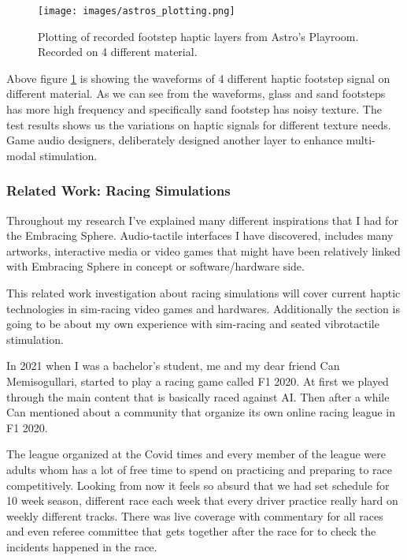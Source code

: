                 \begin{figure}[H]
                    \centering
                    \texttt{[image: images/astros\_plotting.png]}
                    \caption{Plotting of recorded footstep haptic layers from Astro's Playroom. Recorded on 4 different material.}
                    \label{fig:ASTROS_FS}
                \end{figure}

                Above figure \ref{fig:ASTROS_FS} is showing the waveforms of 4 different haptic footstep signal on different material. As we can see from the waveforms, glass and sand footsteps has more high frequency and specifically sand footstep has noisy texture. The test results shows us the variations on haptic signals for different texture needs. Game audio designers, deliberately designed another layer to enhance multi-modal stimulation.\par
            \subsubsection{Related Work: Racing Simulations}
                Throughout my research I've explained many different inspirations that I had for the Embracing Sphere. Audio-tactile interfaces I have discovered, includes many artworks, interactive media or video games that might have been relatively linked with Embracing Sphere in concept or software/hardware side.\par

                This related work investigation about racing simulations will cover current haptic technologies in sim-racing video games and hardwares. Additionally the section is going to be about my own experience with sim-racing and seated vibrotactile stimulation.\par

                In 2021 when I was a bachelor's student, me and my dear friend Can Memisogullari, started to play a racing game called F1 2020. At first we played through the main content that is basically raced against AI. Then after a while Can mentioned about a community that organize its own online racing league in F1 2020.\par
                
                The league organized at the Covid times and every member of the league were adults whom has a lot of free time to spend on practicing and preparing to race competitively. Looking from now it feels so absurd that we had set schedule for 10 week season, different race each week that every driver practice really hard on weekly different tracks. There was live coverage with commentary for all races and even referee committee that gets together after the race for to check the incidents happened in the race.\par

